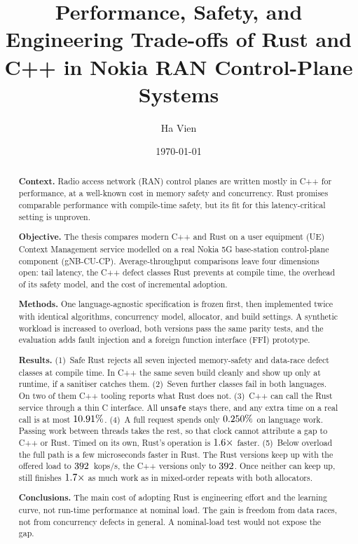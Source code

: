 \documentclass[english,twoside,openright,a4paper,censored,csm,software-track-2020]{HYthesisML}
\title{Performance, Safety, and Engineering Trade-offs of Rust and C++ in Nokia RAN Control-Plane Systems}
\author{Ha Vien}
\date{\today}
\begin{document}
\maketitle

{\singlespacing
\begin{otherlanguage}{english}
\begin{abstract}
      \noindent\textbf{Context.}
      Radio access network (RAN) control planes are written mostly in C++ for performance, at a
      well-known cost in memory safety and concurrency. Rust promises comparable performance with
      compile-time safety, but its fit for this latency-critical setting is unproven.
      
      \noindent\textbf{Objective.}
      The thesis compares modern C++ and Rust on a user equipment (UE) Context Management service
      modelled on a real Nokia 5G base-station control-plane component (gNB-CU-CP).
      Average-throughput comparisons leave four dimensions open: tail latency, the C++ defect classes Rust prevents at compile time, the overhead of
      its safety model, and the cost of incremental adoption.
      
      \noindent\textbf{Methods.}
      One language-agnostic specification is frozen first, then implemented twice with identical
      algorithms, concurrency model, allocator, and build settings. A synthetic workload is increased to
      overload, both versions pass the same parity tests, and the evaluation adds fault injection and a
      foreign function interface (FFI) prototype.
      
      \noindent\textbf{Results.}
      (1)~Safe Rust rejects all seven injected memory-safety and data-race defect classes at compile
      time. In C++ the same seven build cleanly and show up only at runtime, if a sanitiser catches
      them. (2)~Seven further classes fail in both languages. On two of them C++ tooling reports what
      Rust does not. (3)~C++ can call the Rust service through a thin C interface. All \texttt{unsafe} 
      stays there, and any extra time on a real call is at most $10.91\%$. (4)~A full request 
      spends only $0.250\%$ on language work. Passing work between threads takes the rest, 
      so that clock cannot attribute a gap to C++ or Rust. Timed on its own, Rust’s operation 
      is $1.6\times$ faster. 
      (5)~Below overload the full path is a few microseconds faster in Rust. The Rust versions keep up 
      with the offered load to $392$~kops/s, the C++ versions only to $392$. 
      Once neither can keep up, \OverloadSustainedFaster{} still finishes $1.7\times$ as 
      much work as \OverloadSustainedSlower{} in \OverloadThrAgree{} mixed-order repeats with both allocators.
      
      \noindent\textbf{Conclusions.}
      The main cost of adopting Rust is engineering effort and the learning curve, not run-time
      performance at nominal load. The gain is freedom from data races, not from concurrency
      defects in general. A nominal-load test would not expose the gap.
\end{abstract}
\end{otherlanguage}
}
\end{document}
